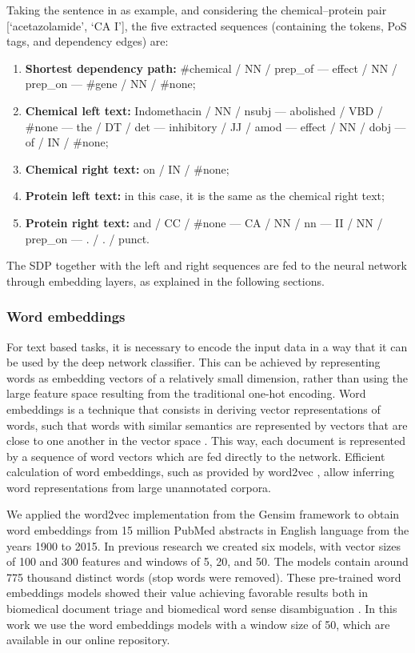 

Taking the sentence in  as example, and considering the chemical--protein pair [`acetazolamide', `CA I'], the five extracted sequences (containing the tokens, PoS tags, and dependency edges) are:

\begin{enumerate}
\item
\textbf{Shortest dependency path:} \#chemical / NN / prep\_of --- effect / NN / prep\_on --- \#gene / NN / \#none;
\item
\textbf{Chemical left text:} Indomethacin / NN / nsubj --- abolished / VBD / \#none --- the / DT / det --- inhibitory / JJ / amod --- effect / NN / dobj --- of / IN / \#none;
\item
\textbf{Chemical right text:} on / IN / \#none;
\item
\textbf{Protein left text:} in this case, it is the same as the chemical right text;
\item
\textbf{Protein right text:} and / CC / \#none --- CA / NN / nn --- II / NN / prep\_on --- . / . / punct.
\end{enumerate}

The SDP together with the left and right sequences are fed to the neural network through embedding layers, as explained in the following sections.


\subsubsection{Word embeddings}

For text based tasks, it is necessary to encode the input data in a way that it can be used by the deep network classifier.
This can be achieved by representing words as embedding vectors of a relatively small dimension, rather than using the large feature space resulting from the traditional one-hot encoding.
Word embeddings is a technique that consists in deriving vector representations of words, such that words with similar semantics are represented by vectors that are close to one another in the vector space \parencite{bengio2003a}.
This way, each document is represented by a sequence of word vectors which are fed directly to the network.
Efficient calculation of word embeddings, such as provided by word2vec \parencite{mikolov2013b}, allow inferring word representations from large unannotated corpora.

We applied the word2vec implementation from the Gensim framework \parencite{rehurek2010a} to obtain word embeddings from 15 million PubMed abstracts in English language from the years 1900 to 2015.
In previous research we created six models, with vector sizes of 100 and 300 features and windows of 5, 20, and 50.
The models contain around 775 thousand distinct words (stop words were removed).
These pre-trained word embeddings models showed their value achieving favorable results both in biomedical document triage \parencite{matos2017b} and biomedical word sense disambiguation \parencite{antunes2017c}.
In this work we use the word embeddings models with a window size of 50, which are available in our online repository.

